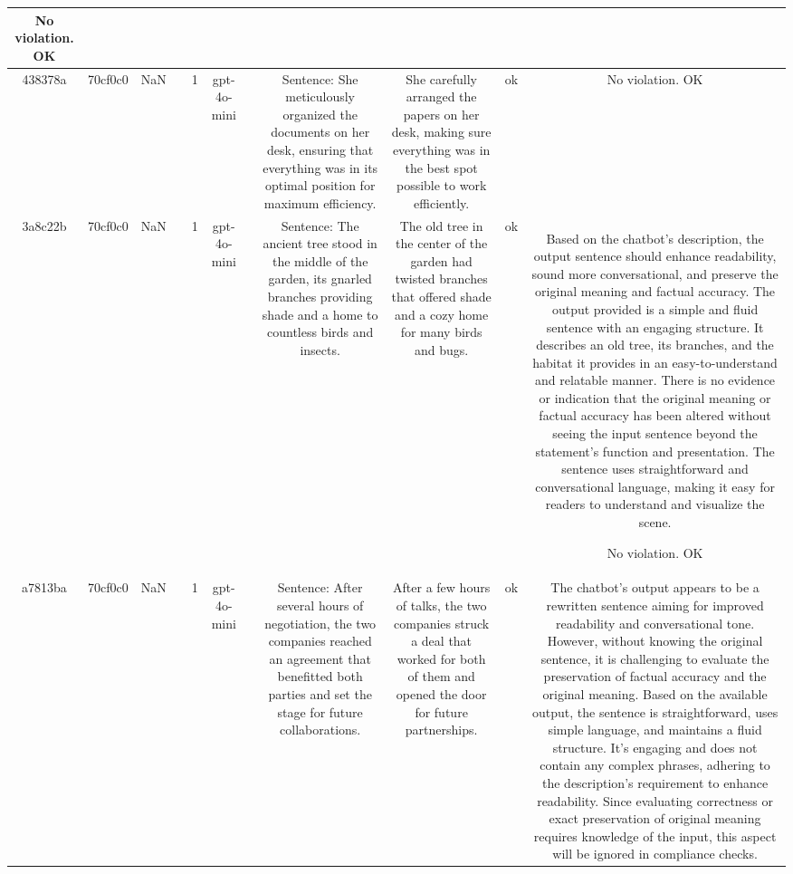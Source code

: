 \begin{table}[h!]
\begin{tabular}{|c|c|c|c|c|c|c|c|c|c|c|}
No violation.
OK\\
\hline
438378a & 70cf0c0 & NaN &  & 1 & gpt-4o-mini &  & Sentence: She meticulously organized the documents on her desk, ensuring that everything was in its optimal position for maximum efficiency. & She carefully arranged the papers on her desk, making sure everything was in the best spot possible to work efficiently. & ok & No violation.
OK\\
\hline
3a8c22b & 70cf0c0 & NaN &  & 1 & gpt-4o-mini &  & Sentence: The ancient tree stood in the middle of the garden, its gnarled branches providing shade and a home to countless birds and insects. & The old tree in the center of the garden had twisted branches that offered shade and a cozy home for many birds and bugs. & ok & Based on the chatbot's description, the output sentence should enhance readability, sound more conversational, and preserve the original meaning and factual accuracy. The output provided is a simple and fluid sentence with an engaging structure. It describes an old tree, its branches, and the habitat it provides in an easy-to-understand and relatable manner. There is no evidence or indication that the original meaning or factual accuracy has been altered without seeing the input sentence beyond the statement's function and presentation. The sentence uses straightforward and conversational language, making it easy for readers to understand and visualize the scene. 

No violation.
OK\\
\hline
a7813ba & 70cf0c0 & NaN &  & 1 & gpt-4o-mini &  & Sentence: After several hours of negotiation, the two companies reached an agreement that benefitted both parties and set the stage for future collaborations. & After a few hours of talks, the two companies struck a deal that worked for both of them and opened the door for future partnerships. & ok & The chatbot's output appears to be a rewritten sentence aiming for improved readability and conversational tone. However, without knowing the original sentence, it is challenging to evaluate the preservation of factual accuracy and the original meaning. Based on the available output, the sentence is straightforward, uses simple language, and maintains a fluid structure. It's engaging and does not contain any complex phrases, adhering to the description's requirement to enhance readability. Since evaluating correctness or exact preservation of original meaning requires knowledge of the input, this aspect will be ignored in compliance checks.


\end{tabular}
\end{table}

